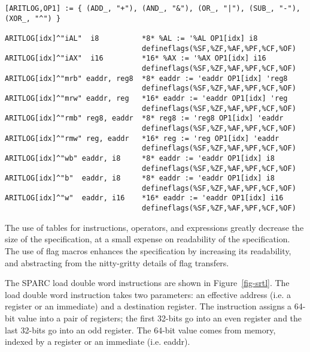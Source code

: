 \centerfigbegin
\begin{footnotesize} 
\begin{verbatim}  
[ARITLOG,OP1] := { (ADD_, "+"), (AND_, "&"), (OR_, "|"), (SUB_, "-"), (XOR_, "^") }

ARITLOG[idx]^"iAL"  i8          *8* %AL := '%AL OP1[idx] i8
                                defineflags(%SF,%ZF,%AF,%PF,%CF,%OF)
ARITLOG[idx]^"iAX"  i16         *16* %AX := '%AX OP1[idx] i16
                                defineflags(%SF,%ZF,%AF,%PF,%CF,%OF)
ARITLOG[idx]^"mrb" eaddr, reg8  *8* eaddr := 'eaddr OP1[idx] 'reg8
                                defineflags(%SF,%ZF,%AF,%PF,%CF,%OF)
ARITLOG[idx]^"mrw" eaddr, reg   *16* eaddr := 'eaddr OP1[idx] 'reg
                                defineflags(%SF,%ZF,%AF,%PF,%CF,%OF)
ARITLOG[idx]^"rmb" reg8, eaddr  *8* reg8 := 'reg8 OP1[idx] 'eaddr
                                defineflags(%SF,%ZF,%AF,%PF,%CF,%OF)
ARITLOG[idx]^"rmw" reg, eaddr   *16* reg := 'reg OP1[idx] 'eaddr
                                defineflags(%SF,%ZF,%AF,%PF,%CF,%OF)
ARITLOG[idx]^"wb" eaddr, i8     *8* eaddr := 'eaddr OP1[idx] i8
                                defineflags(%SF,%ZF,%AF,%PF,%CF,%OF)
ARITLOG[idx]^"b"  eaddr, i8     *8* eaddr := 'eaddr OP1[idx] i8
                                defineflags(%SF,%ZF,%AF,%PF,%CF,%OF)
ARITLOG[idx]^"w"  eaddr, i16    *16* eaddr := 'eaddr OP1[idx] i16
                                defineflags(%SF,%ZF,%AF,%PF,%CF,%OF)
\end{verbatim}  
\end{footnotesize} 

The use of tables for instructions, operators, and expressions greatly
decrease the size of the specification, at a small expense on 
readability of the specification.
The use of flag macros enhances the specification by increasing its 
readability, and abstracting from the nitty-gritty details of flag 
transfers.


The SPARC load double word instructions are shown in Figure~\ref{fig-srtl}. 
The load double word instruction takes two parameters:  an effective
address (i.e. a register or an immediate) and a destination register.
The instruction assigns a 64-bit value into a pair of registers; the
first 32-bits go into an even register and the last 32-bits go into
an odd register.  The 64-bit value comes from memory, indexed
by a register or an immediate (i.e. eaddr).
 
